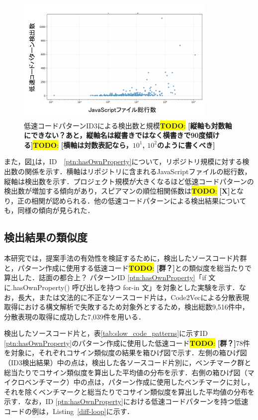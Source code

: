 \documentclass[submit,techrep,noauthor]{ipsj}
\newcommand{\todo}[1]{\colorbox{yellow}{{\bf TODO}:}{\color{red} {\textbf{[#1]}}}}
\begin{document}
\begin{figure}[t]
    \centering
    \includegraphics[width=1.0\linewidth]{./Noguchi_fig/ID3_222_log.pdf}
    \caption{低速コードパターンID3による検出数と規模\todo{縦軸も対数軸にできない？あと，縦軸名は縦書きではなく横書きで90度傾ける}\todo{横軸は対数表記なら，$10^1$, $10^2$のように書くべき}}
    \label{fig:plot_id3}
\end{figure}

また，図\ref{fig:plot_id3}は，ID~~\ref{ptn:hasOwnProperty}について，リポジトリ規模に対する検出数の関係を示す．横軸はリポジトリに含まれるJavaScriptファイルの総行数，縦軸は検出数を示す．プロジェクト規模が大きくなるほど低速コードパターンの検出数が増加する傾向があり，スピアマンの順位相関係数は\todo{X}となり，正の相関が認められる．他の低速コードパターンによる検出結果についても，同様の傾向が見られた．

\subsection{検出結果の類似度}

本研究では，提案手法の有効性を検証するために，検出したソースコード片群と，パターン作成に使用する低速コード\todo{群？}との類似度を総当たりで算出した．誌面の都合上？
パターンID \ref{ptn:hasOwnProperty}「if 文に.hasOwnProperty() 呼び出しを持つ for-in 文」を対象とした実験を示す．なお，長大，または文法的に不正なソースコード片は，Code2Vecによる分散表現取得における構文解析で失敗するため対象外とするため，検出総数9,516件中，分散表現の取得に成功した7,039件を用いる．


検出したソースコード片と，表\ref{tab:slow_code_patterns}に示すID \ref{ptn:hasOwnProperty}のパターン作成に使用した低速コード\todo{群？}78件を対象に，それぞれコサイン類似度の結果を箱ひげ図で示す．左側の箱ひげ図（ID3検出結果）中の点は，検出した各ソースコード片別に，ベンチマーク群と総当たりでコサイン類似度を算出した平均値の分布を示す．右側の箱ひげ図（マイクロベンチマーク）中の点は，パターン作成に使用したベンチマークに対し，それを除くベンチマークと総当たりでコサイン類似度を算出した平均値の分布を示す．なお，ID \ref{ptn:hasOwnProperty}における低速コードパターンを持つ低速コードの例は，Listing~\ref{diff-loop}に示す．
\end{document}
